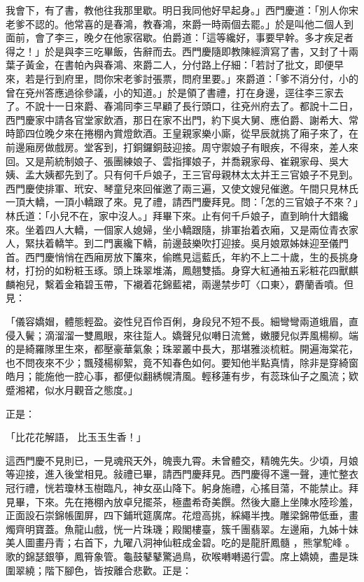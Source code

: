 \begin{showcontents}{}
我會下，有了書，教他往我那里歇。明日我同他好早起身。」西門慶道：「別人你宋老爹不認的。他常喜的是春鴻，教春鴻，來爵一時兩個去罷。」於是叫他二個人到面前，會了李三，晚夕在他家宿歇。伯爵道：「這等纔好，事要早幹。多才疾足者得之！」於是與李三吃畢飯，告辭而去。西門慶隨即教陳經濟寫了書，又封了十兩葉子黃金，在書帕內與春鴻、來爵二人，分付路上仔細：「若討了批文，即便早來，若是行到府里，問你宋老爹討張票，問府里要。」來爵道：「爹不消分付，小的曾在兗州答應過徐參議，小的知道。」於是領了書禮，打在身邊，逕往李三家去了。不說十一日來爵、春鴻同李三早顧了長行頭口，往兗州府去了。都說十二日，西門慶家中請各官堂家飲酒，那日在家不出門，約下吳大舅、應伯爵、謝希大、常時節四位晚夕來在捲棚內賞燈飲酒。王皇親家樂小廝，從早辰就挑了廂子來了，在前邊廂房做戲房。堂客到，打銅鑼銅鼓迎接。周守禦娘子有眼疾，不得來，差人來回。又是荊統制娘子、張團練娘子、雲指揮娘子，并喬親家母、崔親家母、吳大姨、孟大姨都先到了。只有何千戶娘子，王三官母親林太太并王三官娘子不見到。西門慶使排軍、玳安、琴童兒來回催邀了兩三遍，又使文嫂兒催邀。午間只見林氏一頂大轎，一頂小轎跟了來。見了禮，請西門慶拜見。問：「怎的三官娘子不來？」林氏道：「小兒不在，家中沒人。」拜畢下來。止有何千戶娘子，直到晌什大錯纔來。坐着四人大轎，一個家人媳婦，坐小轎跟隨，排軍抬着衣廂，又是兩位青衣家人，緊扶着轎竿。到二門裏纔下轎，前邊鼓樂吹打迎接。吳月娘眾姊妹迎至儀門首。西門慶悄悄在西廂房放下簾來，偷瞧見這藍氏，年約不上二十歲，生的長挑身材，打扮的如粉粧玉琢。頭上珠翠堆滿，鳳翹雙插。身穿大紅通袖五彩粧花四獸麒麟袍兒，繫着金箱碧玉帶，下襯着花錦藍裙，兩邊禁步叮〈口東〉，麝蘭香噴。但見：

「儀容嬌媢，體態輕盈。姿性兒百伶百俐，身段兒不短不長。細彎彎兩道蛾眉，直侵入鬢；滴溜溜一雙鳳眼，來往踅人。嬌聲兒似囀日流鶯，嫩腰兒似弄風楊柳。端的是綺羅隊里生來，都壓豪華氣象；珠翠叢中長大，那堪雅淡梳粧。開遍海棠花，也不問夜來不少；飄殘楊柳絮，竟不知春色如何。要知他半點真情，除非是穿綺窗皓月；能施他一腔心事，都便似翻綉幌清風。輕移蓮有步，有蕊珠仙子之風流；欵蹙湘裙，似水月觀音之態度。」

正是：

「比花花解語，  比玉玉生香！」

這西門慶不見則已，一見魂飛天外，魄喪九霄。未曾體交，精魄先失。少頃，月娘等迎接，進入後堂相見。敍禮已畢，請西門慶拜見。西門慶得不還一聲，連忙整衣冠行禮，恍若瓊林玉樹臨凡，神女巫山降下。躬身施禮，心搖目蕩，不能禁止。拜見畢，下來。先在捲棚內放卓兒擺茶，極盡希奇美饌。然後大廳上坐陳水陸珍羞，正面設石崇錦帳圍屏，四下鋪玳筵廣席。花燈高挑，綵繩半拽。雕梁錦帶低垂，畫燭齊明寶蓋。魚龍山戲，恍一片珠璣；殿閣樓臺，簇千團翡翠。左邊廂，九姊十妹美人圖畫丹青；右首下，九曜八洞神仙粧成金碧。吃的是龍肝鳳髓 ，熊掌駝峰 。歌的錦瑟銀箏，鳳筲象管。龜鼓鼕鼕驚過鳥，砍喉囀囀遏行雲。席上嬌嬈，盡是珠圍翠繞；階下腳色，皆按離合悲歡。正是：


\end{showcontents}
